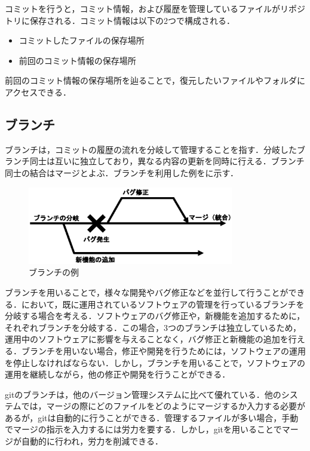 \documentclass[a4j,9pt,twocolumn]{jsarticle}
\begin{document}
コミットを行うと，コミット情報，および履歴を管理しているファイルがリポジトリに保存される．コミット情報は以下の2つで構成される．

\begin{itemize}
\item コミットしたファイルの保存場所
\item 前回のコミット情報の保存場所
\end{itemize}

前回のコミット情報の保存場所を辿ることで，復元したいファイルやフォルダにアクセスできる．

\subsection{ブランチ}
ブランチは，コミットの履歴の流れを分岐して管理することを指す．分岐したブランチ同士は互いに独立しており，異なる内容の更新を同時に行える．ブランチ同士の結合はマージとよぶ．ブランチを利用した例をに示す．

\begin{figure}[h]
\centering
\includegraphics[width=90mm]{img/branch.eps}
\caption{ブランチの例}
\label{branch_ex}
\end{figure}

ブランチを用いることで，様々な開発やバグ修正などを並行して行うことができる．において，既に運用されているソフトウェアの管理を行っているブランチを分岐する場合を考える．ソフトウェアのバグ修正や，新機能を追加するために，それぞれブランチを分岐する．この場合，3つのブランチは独立しているため，運用中のソフトウェアに影響を与えることなく，バグ修正と新機能の追加を行える．ブランチを用いない場合，修正や開発を行うためには，ソフトウェアの運用を停止しなければならない．しかし，ブランチを用いることで，ソフトウェアの運用を継続しながら，他の修正や開発を行うことができる．

gitのブランチは，他のバージョン管理システムに比べて優れている．他のシステムでは，マージの際にどのファイルをどのようにマージするか入力する必要があるが，gitは自動的に行うことができる．管理するファイルが多い場合，手動でマージの指示を入力するには労力を要する．しかし，gitを用いることでマージが自動的に行われ，労力を削減できる．
\end{document}
